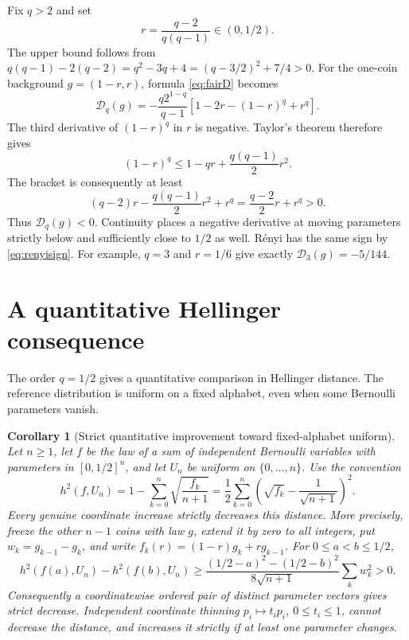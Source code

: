 \documentclass[11pt,a4paper]{amsart}
\numberwithin{equation}{section}
\newtheorem{corollary}[theorem]{Corollary}
\theoremstyle{remark}
\newcommand{\D}{\mathscr D}
\begin{document}
Fix $q>2$ and set
\[
r=\frac{q-2}{q(q-1)}\in(0,1/2).
\]
The upper bound follows from
$q(q-1)-2(q-2)=q^2-3q+4=(q-3/2)^2+7/4>0$.
For the one-coin background $g=(1-r,r)$, formula \eqref{eq:fairD}
becomes
\[
\D_q(g)=-\frac{q2^{1-q}}{q-1}
 [1-2r-(1-r)^q+r^q].
\]
The third derivative of $(1-r)^q$ in $r$ is negative. Taylor's theorem
therefore gives
\[
(1-r)^q\le1-qr+\frac{q(q-1)}2r^2.
\]
The bracket is consequently at least
\[
(q-2)r-\frac{q(q-1)}2r^2+r^q
=\frac{q-2}{2}r+r^q>0.
\]
Thus $\D_q(g)<0$. Continuity places a negative derivative at moving
parameters strictly below and sufficiently close to $1/2$ as well.
R\'enyi has the same sign by \eqref{eq:renyisign}. For example,
$q=3$ and $r=1/6$ give exactly $\D_3(g)=-5/144$.

\section{A quantitative Hellinger consequence}
\label{sec:hellinger}

The order $q=1/2$ gives a quantitative comparison in Hellinger distance.
The reference distribution is uniform on a fixed alphabet, even when
some Bernoulli parameters vanish.

\begin{corollary}[Strict quantitative improvement toward fixed-alphabet uniform]
\label{cor:hellinger}
Let $n\ge1$, let $f$ be the law of a sum of independent Bernoulli
variables with parameters in $[0,1/2]^n$, and let $U_n$ be uniform on
$\{0,\ldots,n\}$. Use the convention
\[
h^2(f,U_n)=1-\sum_{k=0}^n\sqrt{\frac{f_k}{n+1}}
 =\frac12\sum_{k=0}^n
   \left(\sqrt{f_k}-\frac1{\sqrt{n+1}}\right)^2.
\]
Every genuine coordinate increase strictly decreases this distance.
More precisely, freeze the other $n-1$ coins with law $g$, extend it
by zero to all integers, put $w_k=g_{k-1}-g_k$, and write
$f_k(r)=(1-r)g_k+rg_{k-1}$. For $0\le a<b\le1/2$,
\begin{equation}
h^2(f(a),U_n)-h^2(f(b),U_n)
\ge\frac{(1/2-a)^2-(1/2-b)^2}{8\sqrt{n+1}}
      \sum_k w_k^2>0.
\label{eq:hellingerbound}
\end{equation}
Consequently a coordinatewise ordered pair of distinct parameter
vectors gives strict decrease. Independent coordinate thinning
$p_i\mapsto t_ip_i$, $0\le t_i\le1$, cannot decrease the distance,
and increases it strictly if at least one parameter changes.
\end{corollary}
\end{document}
